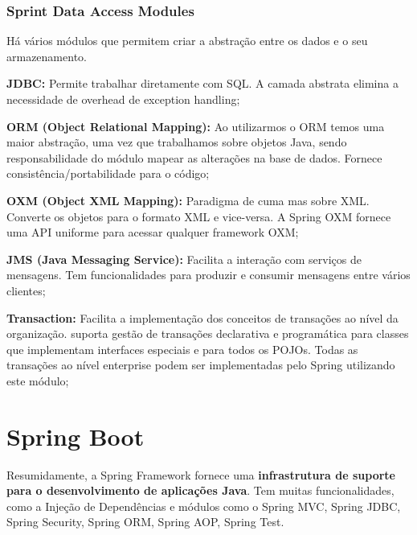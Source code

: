 \documentclass{article}
\begin{document}
\pagebreak

\subsubsection{Sprint Data Access Modules}

Há vários módulos que permitem criar a abstração entre os dados e o seu armazenamento.

\begin{flushleft}
  \textbf{JDBC:} Permite trabalhar diretamente com SQL. A camada abstrata
  elimina a necessidade de overhead de exception handling;

  \vspace{2mm}

  \textbf{ORM (Object Relational Mapping):} Ao utilizarmos o ORM temos uma maior abstração, uma vez que trabalhamos sobre objetos Java, sendo
  responsabilidade do módulo mapear as alterações na base de dados.
  Fornece consistência/portabilidade para o código;

  \vspace{2mm}

  \textbf{OXM (Object XML Mapping):} Paradigma de cuma mas sobre XML.
  Converte os objetos para o formato XML e vice-versa. A Spring OXM
  fornece uma API uniforme para acessar qualquer framework OXM;

  \vspace{2mm}

  \textbf{JMS (Java Messaging Service):} Facilita a interação com serviços de
  mensagens. Tem funcionalidades para produzir e consumir mensagens
  entre vários clientes;

  \vspace{2mm}

  \textbf{Transaction:} Facilita a implementação dos conceitos de transações ao nível da organização.
  suporta gestão de transações declarativa e programática para classes que
  implementam interfaces especiais e para todos os POJOs. Todas as transações
  ao nível enterprise podem ser implementadas pelo Spring utilizando este módulo; 
\end{flushleft}

\section{Spring Boot}

Resumidamente, a Spring Framework fornece uma \textbf{infrastrutura
de suporte para o desenvolvimento de aplicações Java}.
Tem muitas funcionalidades, como a Injeção de Dependências e
módulos como o Spring MVC, Spring JDBC, Spring Security,
Spring ORM, Spring AOP, Spring Test.
\end{document}

